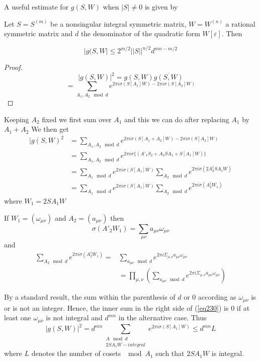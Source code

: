 A useful estimate for $g(S, W)$ when $|S| \neq 0$ is given by 

\setcounter{lem}{18}
\begin{lem}\label{chap13:lem19}%
 Let $S = S^{(m)}$ be a nonsingular integral symmetric matrix, $W
=W^{(n)}$ a rational symmetric matrix and $d$ the denominator of the
quadratic form $W[\varepsilon]$. Then 
\end{lem}
\begin{equation*}
|g(S, W| \le 2^{m/2} || S ||^{n/2} d^{mn - m/2} \tag{229}\label{eq229}
\end{equation*}
\begin{proof}
$$
|g(S,W)|^2 = g (S, W) \overline{g(S, W)} 
$$
$$
= \sum_{A_1, A_2 \mod d} e^{2 \pi i \sigma (S[A_1]W) - 2 \pi i \sigma
  (S[A_2]W)}  
$$\pageoriginale 
\end{proof}

Keeping $A_2$ fixed we first sum over $A_1$ and this we can do after
replacing $A_1$ by $A_1 + A_2$ We then get  
\begin{align*}
|g(S, W)^2 & = \sum_{A_1, A_2 \mod d} e^{2 \pi i \sigma (S[A_1 +
    A_2]W) - 2 \pi i \sigma (S[A_2]W)}\\ 
&  = \sum_{A_1, A_2 \mod d} e^{2 \pi i \sigma \{(A'_1 S_2 + A_2 SA_1 +
  S[A_1]W) \}}\\ 
&  = \sum_{A_1 \mod d} e^{2 \pi i \sigma (S[A_1]W)} \sum_{A_2 \mod d}
e^{2 \pi i \sigma (2A^1_2 SA_1 W)}\\ 
&  = \sum_{A_1 \mod d} e^{2 \pi i \sigma (S[A_1]W)} \sum_{A_2 \mod d}
e^{2 \pi i \sigma (A^1_2 W_1)} \tag{230}\label{eq230} 
\end{align*}
where $W_1 = 2SA_1 W$

If $W_1 = (\omega_{\mu \nu})$ and $A_2 = (a_{\mu \nu})$ then
$$
\sigma (A'_2 W_1) = \sum_{\mu \nu} a_{\mu \nu} \omega_{\mu \nu}
$$
and
\begin{align*}
\sum_{A_2 \mod d} e^{2 \pi i \sigma (A^1_2 W_1)} = & \sum_{a_{\mu \nu
  } \mod d} e^{2 \pi i \Sigma_{\mu, \nu} a_{\mu \nu} \omega_{\mu
    \nu}}\\ 
& = \prod_{\mu, \nu} (\sum_{a_{\mu \nu} \mod d} e^{2 \pi i
  \Sigma_{\mu, \nu}a_{\mu \nu} \omega_{\mu \nu}}) 
\end{align*}

By a standard result, the sum within the parenthesis of $d$ or $0$
according as $\omega_{\mu \nu}$ is or is not an integer. Hence, the
inner sum in the right side of (\ref{eq230}) is $0$ if at least one
$\omega_{\mu \nu}$ is not integral and $d^{mn}$ in the alternative
case. Thus 
\begin{equation*}
|g (S, W)|^2 = d^{mn} \sum_{\substack{A \mod d\\ 2 SA_1 W- integral}}
e^{2 \pi i \sigma (S[A_1]W)} \le d^{mn} L \tag{231}\label{eq231}  
\end{equation*}\pageoriginale 
where $L$ denotes the number of cosets $\mod A_1$ such that $2 S A_1
W$ is integral. 

